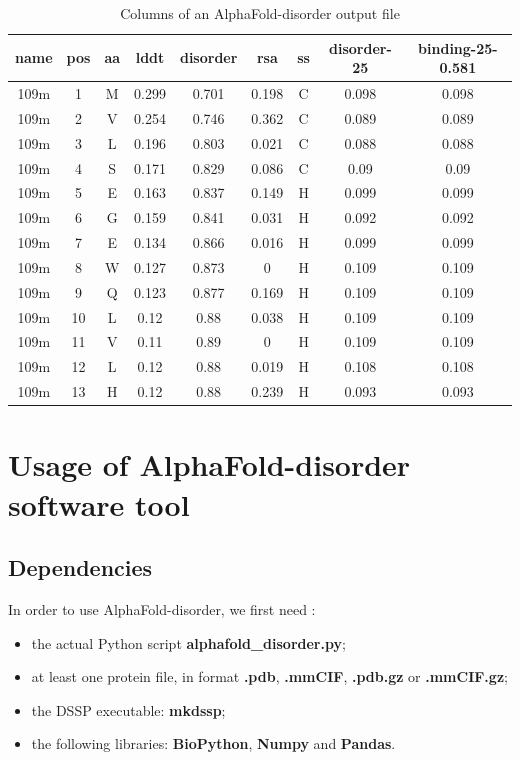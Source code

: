 \begin{table}[h!]
    \centering
    \begin{tabular}{c|c|c|c|c|c|c|c|c}
        \textbf{name} & \textbf{pos} & \textbf{aa} & \textbf{lddt} & \textbf{disorder} & \textbf{rsa} & \textbf{ss} & \textbf{disorder-25} & \textbf{binding-25-0.581} \\
        \hline
        109m & 1 & M & 0.299 & 0.701 & 0.198 & C & 0.098 & 0.098 \\
        109m & 2 & V & 0.254 & 0.746 & 0.362 & C & 0.089 & 0.089 \\
        109m & 3 & L & 0.196 & 0.803 & 0.021 & C & 0.088 & 0.088 \\
        109m & 4 & S & 0.171 & 0.829 & 0.086 & C & 0.09 & 0.09 \\
        109m & 5 & E & 0.163 & 0.837 & 0.149 & H & 0.099 & 0.099 \\
        109m & 6 & G & 0.159 & 0.841 & 0.031 & H & 0.092 & 0.092 \\
        109m & 7 & E & 0.134 & 0.866 & 0.016 & H & 0.099 & 0.099 \\
        109m & 8 & W & 0.127 & 0.873 & 0 & H & 0.109 & 0.109 \\
        109m & 9 & Q & 0.123 & 0.877 & 0.169 & H & 0.109 & 0.109 \\
        109m & 10 & L & 0.12 & 0.88 & 0.038 & H & 0.109 & 0.109 \\
        109m & 11 & V & 0.11 & 0.89 & 0 & H & 0.109 & 0.109 \\
        109m & 12 & L & 0.12 & 0.88 & 0.019 & H & 0.108 & 0.108 \\
        109m & 13 & H & 0.12 & 0.88 & 0.239 & H & 0.093 & 0.093 \\
    \end{tabular}
    \caption{Columns of an AlphaFold-disorder output file}
    \label{tab:dataset}
\end{table}

\section{Usage of AlphaFold-disorder software tool}
\subsection{Dependencies}
In order to use AlphaFold-disorder, we first need :
\begin{itemize}
    \item the actual Python script \textbf{alphafold\_disorder.py};
    \item at least one protein file, in format \textbf{.pdb}, \textbf{.mmCIF}, \textbf{.pdb.gz} or \textbf{.mmCIF.gz};
    \item the DSSP executable: \textbf{mkdssp};
    \item the following libraries: \textbf{BioPython}, \textbf{Numpy} and \textbf{Pandas}.
\end{itemize}

